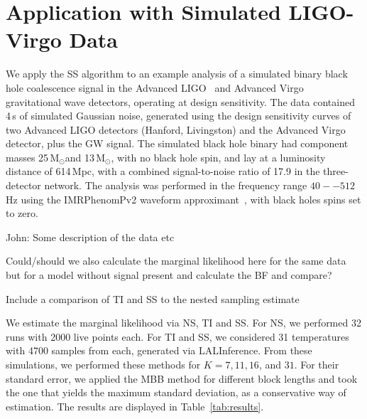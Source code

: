 \documentclass[aps,reprint,amsmath,amssymb,showpacs,showkeys]{revtex4-1}%
\newcommand{\cb}{ \color{blue}}
\newcommand{\Msun}{$\text{M}_{\odot}$}
\begin{document}


\section{Application with Simulated LIGO-Virgo Data} \label{sec:LIGO}
We apply the SS algorithm to an example analysis of a simulated binary black hole
coalescence signal in the Advanced LIGO~\cite{0264-9381-32-7-074001} and Advanced Virgo~\cite{0264-9381-32-2-024001}
gravitational wave detectors, operating at design sensitivity.
The data contained 4\,s of simulated Gaussian noise, generated using the design
sensitivity curves of two Advanced LIGO detectors (Hanford, Livingston) and the Advanced Virgo detector,
plus the GW signal. The simulated black hole binary had component masses 25\,\Msun and 13\,\Msun,
with no black hole spin, and lay at a luminosity distance of 614\,Mpc, with a combined signal-to-noise ratio of 17.9 in the
three-detector network. The analysis was performed in the frequency range $40--512$\,Hz using the IMRPhenomPv2
waveform approximant~\cite{}, with black holes spins set to zero. 

{\cb John: Some description of the data etc


Could/should we also calculate the marginal likelihood here for the same data but for a model without signal present and calculate the BF and compare?

Include a comparison of TI and SS to the nested sampling estimate}

We estimate the marginal likelihood via NS, TI and SS.  For NS, we performed 32 runs with 2000 live points each.  For TI and SS, we considered 31 temperatures with 4700 samples from each, generated via LALInference.  From these simulations, we performed these methods for $K=7, 11, 16$, and $31$.  For their standard error, we applied the MBB method for different block lengths and took the one that yields the maximum standard deviation, as a conservative way of estimation. The results are displayed in Table~\ref{tab:results}.
\end{document}
